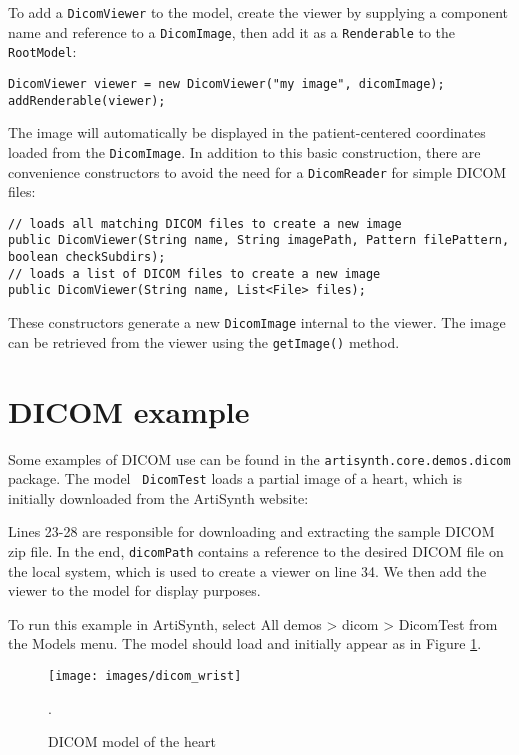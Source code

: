 To add a \lstinline{DicomViewer} to the model, create the viewer by supplying a component name
and reference to a \lstinline{DicomImage}, then add it as a \lstinline{Renderable} to the \lstinline{RootModel}:
\begin{lstlisting}[]
DicomViewer viewer = new DicomViewer("my image", dicomImage);
addRenderable(viewer);
\end{lstlisting}
The image will automatically be displayed in the patient-centered coordinates loaded 
from the \lstinline{DicomImage}.  In addition to this basic construction, there 
are convenience constructors to avoid the need for a \lstinline{DicomReader}
for simple DICOM files:
\begin{lstlisting}[]
// loads all matching DICOM files to create a new image
public DicomViewer(String name, String imagePath, Pattern filePattern, boolean checkSubdirs);
// loads a list of DICOM files to create a new image
public DicomViewer(String name, List<File> files);
\end{lstlisting}
These constructors generate a new \lstinline{DicomImage} internal to the viewer.  The image
can be retrieved from the viewer using the \lstinline{getImage()} method.

\section{DICOM example}

Some examples of DICOM use can be found in
the \texttt{artisynth.core.demos.dicom} package. The model {\tt
DicomTest} loads a partial image of a heart, which is initially
downloaded from the ArtiSynth website:
%
\lstset{numbers=left}

\lstset{numbers=none}
%
Lines 23-28 are responsible for downloading and extracting the sample
DICOM zip file.  In the end, \lstinline{dicomPath} contains a
reference to the desired DICOM file on the local system, which is used
to create a viewer on line 34.  We then add the viewer to the model
for display purposes.  

To run this example in ArtiSynth, select {\sf All demos > dicom >
DicomTest} from the {\sf Models} menu. The model should load and
initially appear as in Figure \ref{fig:dicom:heart}.

\begin{figure}[ht]
   \centering
   \texttt{[image: images/dicom\_wrist]}
   \caption{DICOM model of the heart}.
   \label{fig:dicom:heart}
\end{figure}

